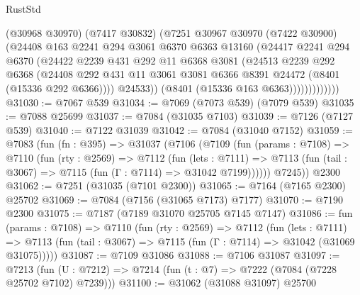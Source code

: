 \begin{lexlean}{RustStd}
\begin{coremodule}
                      (@30968 @30970)
                      (@7417 @30832)
                      (@7251
                        @30967
                        @30970
                        (@7422 @30900)
                        (@24408
                          @163
                          @2241
                          @294
                          @3061
                          @6370
                          @6363
                          @13160
                          (@24417
                            @2241
                            @294
                            @6370
                            (@24422
                              @2239
                              @431
                              @292
                              @11
                              @6368
                              @3081
                              (@24513
                                @2239
                                @292
                                @6368
                                (@24408
                                  @292
                                  @431
                                  @11
                                  @3061
                                  @3081
                                  @6366
                                  @8391
                                  @24472
                                  (@8401 (@15336 @292 @6366))))
                              @24533))
                          (@8401 (@15336 @163 @6363)))))))))))))
@31030 := @7067 @539
@31034 := @7069 (@7073 @539) (@7079 @539)
@31035 := @7088 @25699
@31037 := @7084 (@31035 @7103)
@31039 := @7126 (@7127 @539)
@31040 := @7122 @31039
@31042 := @7084 (@31040 @7152)
@31059 := @7083
    (fun (fn : @395) =>
    @31037
      (@7106
        (@7109
          (fun (params : @7108) =>
          @7110
            (fun (rty : @2569) =>
            @7112
              (fun (lets : @7111) =>
              @7113 (fun (tail : @3067) => @7115 (fun (Γ : @7114) => @31042 @7199))))))
        @7245))
    @2300
@31062 := @7251 (@31035 (@7101 @2300))
@31065 := @7164 (@7165 @2300) @25702
@31069 := @7084 (@7156 (@31065 @7173) @7177)
@31070 := @7190 @2300
@31075 := @7187 (@7189 @31070 @25705 @7145 @7147)
@31086 := fun (params : @7108) =>
  @7110
    (fun (rty : @2569) =>
    @7112
      (fun (lets : @7111) =>
      @7113 (fun (tail : @3067) => @7115 (fun (Γ : @7114) => @31042 (@31069 @31075)))))
@31087 := @7109 @31086
@31088 := @7106 @31087
@31097 := @7213
    (fun (U : @7212) => @7214 (fun (t : @7) => @7222 (@7084 (@7228 @25702 @7102) @7239)))
@31100 := @31062 (@31088 @31097) @25700

\end{coremodule}
\end{lexlean}
